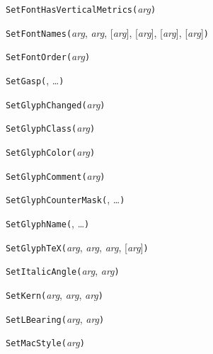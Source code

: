 \noindent\texttt{SetFontHasVerticalMetrics(}\textit{arg}\texttt{)}


\noindent\texttt{SetFontNames(}\textit{arg}, \textit{arg}, [\textit{arg}], [\textit{arg}], [\textit{arg}], [\textit{arg}]\texttt{)}


\noindent\texttt{SetFontOrder(}\textit{arg}\texttt{)}


\noindent\texttt{SetGasp(}, \ldots\texttt{)}


\noindent\texttt{SetGlyphChanged(}\textit{arg}\texttt{)}


\noindent\texttt{SetGlyphClass(}\textit{arg}\texttt{)}


\noindent\texttt{SetGlyphColor(}\textit{arg}\texttt{)}


\noindent\texttt{SetGlyphComment(}\textit{arg}\texttt{)}


\noindent\texttt{SetGlyphCounterMask(}, \ldots\texttt{)}


\noindent\texttt{SetGlyphName(}, \ldots\texttt{)}


\noindent\texttt{SetGlyphTeX(}\textit{arg}, \textit{arg}, \textit{arg}, [\textit{arg}]\texttt{)}


\noindent\texttt{SetItalicAngle(}\textit{arg}, \textit{arg}\texttt{)}


\noindent\texttt{SetKern(}\textit{arg}, \textit{arg}, \textit{arg}\texttt{)}


\noindent\texttt{SetLBearing(}\textit{arg}, \textit{arg}\texttt{)}


\noindent\texttt{SetMacStyle(}\textit{arg}\texttt{)}


